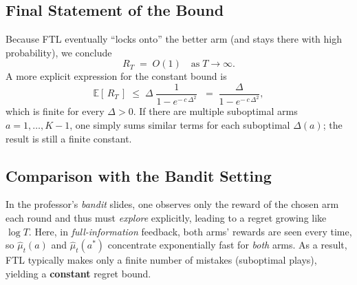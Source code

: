 \subsection*{Final Statement of the Bound}

Because FTL eventually ``locks onto'' the better arm (and stays there with high probability), we conclude
\[
  R_T
  \;=\;
  O(1)
  \quad\text{as}\;T\to\infty.
\]
A more explicit expression for the constant bound is
\[
  \mathbb{E}[\,R_T\,]
  \;\le\;
  \Delta
  \;\frac{1}{1 - e^{-\,c\,\Delta^2}}
  \;\;=\;
  \frac{\Delta}{1 - e^{-\,c\,\Delta^2}},
\]
which is finite for every $\Delta>0$.  If there are multiple suboptimal arms $a=1,\dots,K-1$, one simply sums similar terms for each suboptimal $\Delta(a)$; the result is still a finite constant.

\subsection*{Comparison with the Bandit Setting}

In the professor's \emph{bandit} slides, one observes only the reward of the chosen arm each round and thus must \emph{explore} explicitly, leading to a regret growing like $\log T$.  Here, in \emph{full-information} feedback, both arms' rewards are seen every time, so $\hat{\mu}_t(a)$ and $\hat{\mu}_t(a^*)$ concentrate exponentially fast for \emph{both} arms.  As a result, FTL typically makes only a finite number of mistakes (suboptimal plays), yielding a \textbf{constant} regret bound.